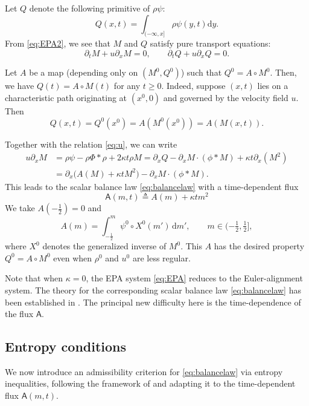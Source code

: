 \documentclass[10pt,a4paper]{amsart}
\def\dd{\mathrm{d}}
\def\pa{\partial}
\def\A{\mathsf{A}}
\begin{document}
	Let $Q$ denote the following primitive of $\rho\psi$:
	\[
	Q(x,t) = \int_{(-\infty,x]} \rho \psi(y,t)\dd y.
	\]
	From \eqref{eq:EPA2}, we see that $M$ and $Q$ satisfy pure transport equations:
	\[
	\pa_t M + u\pa_x M  =  0, \qquad
	\pa_t Q + u\pa_x Q  =  0.
	\]
	
	Let $A$ be a map (depending only on $(M^0, Q^0)$) such that $Q^0 = A\circ M^0$. 
	Then, we have $Q(t) = A\circ M(t)$ for any $t\geq0$. Indeed, suppose $(x,t)$ lies on a characteristic path originating at $(x^0,0)$ and governed by the velocity field $u$. Then
	\[
	Q(x,t) = Q^0(x^0)=A(M^0(x^0))=A(M(x,t)).
	\]
	
	Together with the relation \eqref{eq:u}, we can write
	\begin{align*}
		u\pa_x M  & = \rho \psi - \rho \Phi*\rho +2\kappa t\rho M = \pa_x Q - \pa_x M\cdot (\phi\ast M) + \kappa t \pa_x(M^2)\\
		& = \pa_x \big(A(M)+\kappa tM^2\big) - \pa_x M \cdot (\phi\ast M).
	\end{align*}
	This leads to the scalar balance law \eqref{eq:balancelaw} with a time-dependent flux
	\begin{equation}\label{def:At}
		\A(m,t) \triangleq A(m) +\kappa t m^2 %
	\end{equation} 
	We take $A(-\frac12) = 0$ and
	\begin{equation}
		\label{def:Agen}
		A(m) = \int_{-\frac12}^m \psi^0\circ X^0(m')\,\dd m',
		\qquad m\in (-\tfrac12, \tfrac12],
	\end{equation}
	where $X^0$ denotes the generalized inverse of $M^0$.  This $A$ has the desired property $Q^0 = A\circ M^0$ even when $\rho^0$ and $u^0$ are less regular.
	
	Note that when $\kappa=0$, the EPA system \eqref{eq:EPA} reduces to the Euler-alignment system. The theory for the corresponding scalar balance law \eqref{eq:balancelaw} has been established in \cite{leslie2023sticky}. The principal new difficulty here is the time-dependence of the flux $\A$.
	
	
	\subsection{Entropy conditions}
	We now introduce an admissibility criterion for \eqref{eq:balancelaw} via entropy inequalities, following the framework of \cite{leslie2023sticky} and adapting it to the time-dependent flux $\A(m,t)$.
	
\end{document}
